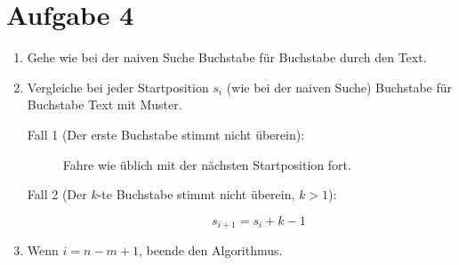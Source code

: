 \documentclass[a4paper, 11pt]{article}
\begin{document}
    \section*{Aufgabe 4}
    \begin{enumerate}
        \item Gehe wie bei der naiven Suche Buchstabe für Buchstabe durch den Text.
        \item Vergleiche bei jeder Startposition $s_i$ (wie bei der naiven Suche) Buchstabe für Buchstabe Text mit Muster.
        \begin{description}
            \item[Fall 1 (Der erste Buchstabe stimmt nicht überein):]
            Fahre wie üblich mit der nächsten Startposition fort.
            \item[Fall 2 (Der $k$-te Buchstabe stimmt nicht überein, $k > 1$):]
            \[
                s_{i + 1} = s_i + k - 1
            \]
        \end{description}
        \item Wenn $i = n - m + 1$, beende den Algorithmus.
    \end{enumerate}
\end{document}
